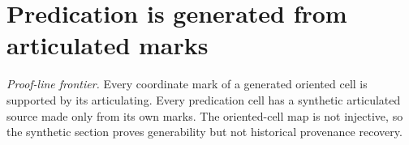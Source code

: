 \section{Predication is generated from articulated marks}

\begin{theorem}\label{thm:predication-mark-provenance}\notready{}
\emph{Proof-line frontier.} Every coordinate mark of a generated oriented cell is supported by its articulating. Every predication cell has a synthetic articulated source made only from its own marks. The oriented-cell map is not injective, so the synthetic section proves generability but not historical provenance recovery.
\end{theorem}
